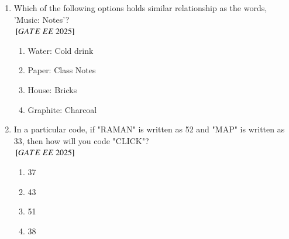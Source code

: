 \documentclass[journal,12pt,onecolumn]{IEEEtran}
\theoremstyle{remark}
\begin{document}
\begin{enumerate}
   \item Which of the following options holds similar relationship as the words, 'Music: Notes'?  \\   
${}\left[GATE\ EE\ 2025\right]$\\
    \begin{enumerate}[label=(\Alph*)]
\item Water: Cold drink \\
\item Paper: Class Notes \\
\item House: Bricks \\
\item Graphite: Charcoal \\
    \end{enumerate}

   \item In a particular code, if "RAMAN" is written as 52 and "MAP" is written as 33, then how will you code "CLICK"?  \\   
${}\left[GATE\ EE\ 2025\right]$\\
    \begin{enumerate}[label=(\Alph*)]
\item 37 \\
\item 43 \\
\item 51 \\
\item 38 \\
    \end{enumerate}


\end{enumerate}
\end{document}
